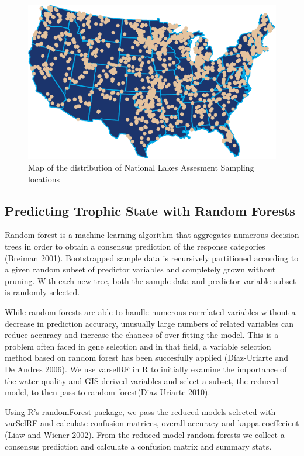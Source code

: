 \documentclass[11pt,]{article}
\begin{document}
\begin{figure}[htbp]
\centering
\includegraphics{./manuscript_files/figure-latex/nlaMap.pdf}
\caption{Map of the distribution of National Lakes Assesment Sampling
locations\label{fig:nlaMap}}
\end{figure}

\subsection{Predicting Trophic State with Random
Forests}\label{predicting-trophic-state-with-random-forests}

Random forest is a machine learning algorithm that aggregates numerous
decision trees in order to obtain a consensus prediction of the response
categories (Breiman 2001). Bootstrapped sample data is recursively
partitioned according to a given random subset of predictor variables
and completely grown without pruning. With each new tree, both the
sample data and predictor variable subset is randomly selected.

While random forests are able to handle numerous correlated variables
without a decrease in prediction accuracy, unusually large numbers of
related variables can reduce accuracy and increase the chances of
over-fitting the model. This is a problem often faced in gene selection
and in that field, a variable selection method based on random forest
has been succesfully applied (D{í}az-Uriarte and De Andres 2006). We use
varselRF in R to initially examine the importance of the water quality
and GIS derived variables and select a subset, the reduced model, to
then pass to random forest(Diaz-Uriarte 2010).

Using R's randomForest package, we pass the reduced models selected with
varSelRF and calculate confusion matrices, overall accuracy and kappa
coeffecient (Liaw and Wiener 2002). From the reduced model random
forests we collect a consensus prediction and calculate a confusion
matrix and summary stats.
\end{document}
